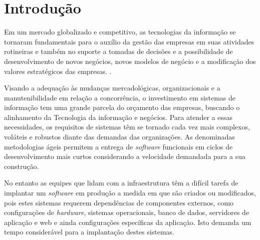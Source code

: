 \section{\esp Introdução}

Em um mercado globalizado e competitivo, as tecnologias da informação se tornaram fundamentais para o auxílio da gestão das empresas em suas atividades rotineiras e também no suporte a tomadas de decisões e a possibilidade de desenvolvimento de novos negócios, novos modelos de negócio e a modificação dos valores estratégicos das empresas. \cite{audy}.

Visando a adequação às mudanças mercadológicas, organizacionais e a manutenibilidade em relação a concorrência, o investimento em sistemas de informação tem uma grande parcela do orçamento das empresas, buscando o alinhamento da Tecnologia da informação e negócios. \cite{luftman}  
Para atender a essas necessidades, os requisitos de sistemas têm se tornado cada vez mais complexos, voláteis e robustos diante das demandas das organizações. 
As denominadas metodologias ágeis permitem a entrega de  \textit{software} funcionais em ciclos de desenvolvimento mais curtos considerando a velocidade demandada para a sua construção. \cite{sbbrocco} 
          
No entanto as equipes que lidam com a infraestrutura têm a difícil tarefa de implantar um \textit{software} em produção a medida em que são criados ou modificados, pois estes sistemas requerem dependências de componentes externos, como configurações de \textit{hardware}, sistemas operacionais, banco de dados, servidores de aplicação e web e ainda configurações específicas da aplicação. Isto demanda um tempo considerável para a implantação destes sistemas.

